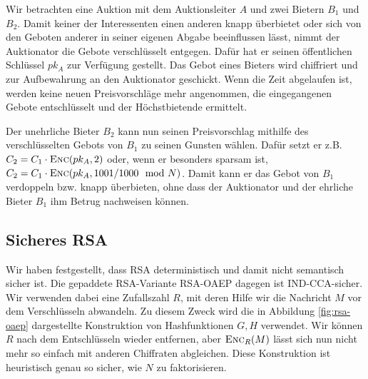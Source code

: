 \begin{description}
    \begin{beispiel}
    	Wir betrachten eine Auktion mit dem Auktionsleiter $A$ und zwei Bietern $B_1$ und $B_2$. Damit keiner der Interessenten einen
    	anderen knapp überbietet oder sich von den Geboten anderer in seiner eigenen Abgabe beeinflussen lässt, nimmt der Auktionator die Gebote verschlüsselt entgegen. Dafür hat er seinen öffentlichen Schlüssel $pk_A$ zur Verfügung gestellt. Das Gebot eines Bieters wird chiffriert und zur Aufbewahrung an den Auktionator geschickt. Wenn die Zeit abgelaufen ist, werden keine neuen Preisvorschläge mehr angenommen, die eingegangenen Gebote entschlüsselt und der Höchstbietende ermittelt.
    
    	Der unehrliche Bieter $B_2$ kann nun seinen Preisvorschlag mithilfe des verschlüsselten Gebots von $B_1$ zu seinen Gunsten wählen. Dafür setzt er z.B. $C_2 =
    	C_1 \cdot \textsc{Enc}({pk_A, 2})$ oder, wenn er besonders sparsam ist, $C_2 = C_1 \cdot \textsc{Enc}({pk_A, 1001/1000 \mod N})$. Damit kann er das Gebot von $B_1$ verdoppeln
    	bzw. knapp überbieten, ohne dass der Auktionator und der ehrliche Bieter $B_1$ ihm Betrug nachweisen können.
    \end{beispiel}  
%    
%    
%    
%    
\end{description} 

\subsection{Sicheres RSA}
Wir haben festgestellt, dass RSA deterministisch und damit nicht semantisch sicher ist. Die gepaddete RSA-Variante RSA-OAEP dagegen ist IND-CCA-sicher. Wir
verwenden dabei eine Zufallszahl $R$, mit deren Hilfe wir die Nachricht $M$ vor dem Verschlüsseln abwandeln. Zu diesem Zweck wird die in Abbildung
\ref{fig:rsa-oaep} dargestellte Konstruktion von Hashfunktionen $G, H$ verwendet. Wir können $R$ nach dem Entschlüsseln wieder entfernen, aber $\textsc{Enc}_R(M)$
lässt sich nun nicht mehr so einfach mit anderen Chiffraten abgleichen.
Diese Konstruktion ist heuristisch genau so sicher, wie $N$ zu faktorisieren.

